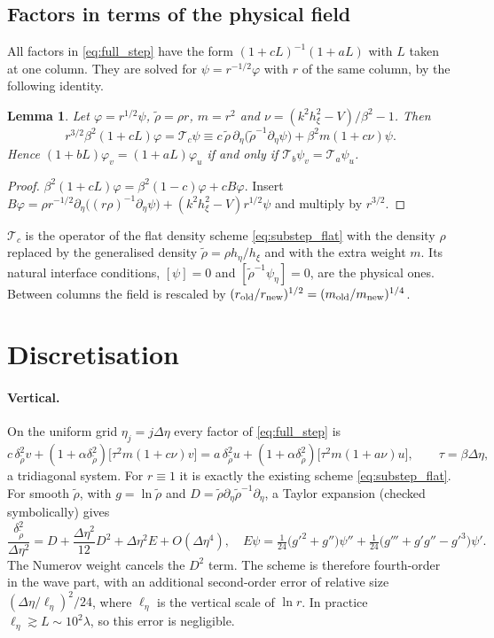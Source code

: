 \documentclass[11pt,a4paper]{article}
\newtheorem{lemma}{Lemma}
\theoremstyle{remark}
\newcommand{\rt}{\tilde\rho}
\newcommand{\het}{\nu}
\newcommand{\pd}{\partial}
\begin{document}
\subsection{Factors in terms of the physical field}

All factors in \eqref{eq:full_step} have the form $(1+cL)^{-1}(1+aL)$ with $L$
taken at one column. They are solved for $\psi=r^{-1/2}\varphi$ with $r$ of the
same column, by the following identity.

\begin{lemma}\label{lem:psi_form}
Let $\varphi=r^{1/2}\psi$, $\rt=\rho r$, $m=r^2$ and
$\het=(k^2h_\xi^2-V)/\beta^2-1$. Then
\[
r^{3/2}\beta^2(1+cL)\varphi=\mathcal T_c\psi\equiv c\,\rt\,\pd_\eta\bigl(\rt^{-1}\pd_\eta\psi\bigr)+\beta^2m(1+c\het)\psi .
\]
Hence $(1+bL)\varphi_v=(1+aL)\varphi_u$ if and only if $\mathcal T_b\psi_v=\mathcal T_a\psi_u$.
\end{lemma}
\begin{proof}
$\beta^2(1+cL)\varphi=\beta^2(1-c)\varphi+cB\varphi$. Insert
$B\varphi=\rho r^{-1/2}\pd_\eta\bigl((r\rho)^{-1}\pd_\eta\psi\bigr)+(k^2h_\xi^2-V)r^{1/2}\psi$
and multiply by $r^{3/2}$.
\end{proof}

$\mathcal T_c$ is the operator of the flat density scheme \eqref{eq:substep_flat}
with the density $\rho$ replaced by the generalised density $\rt=\rho h_\eta/h_\xi$
and with the extra weight $m$. Its natural interface conditions,
$[\psi]=0$ and $[\rt^{-1}\psi_\eta]=0$, are the physical ones. Between columns
the field is rescaled by $(r_{\rm old}/r_{\rm new})^{1/2}=(m_{\rm old}/m_{\rm new})^{1/4}$.

\section{Discretisation}\label{sec:disc}

\paragraph{Vertical.} On the uniform grid $\eta_j=j\Delta\eta$ every factor of
\eqref{eq:full_step} is
\begin{equation}\label{eq:scheme}
c\,\delta^2_{\rt}v+(1+\alpha\delta^2_{\rt})\bigl[\tau^2m(1+c\het)v\bigr]=a\,\delta^2_{\rt}u+(1+\alpha\delta^2_{\rt})\bigl[\tau^2m(1+a\het)u\bigr],\qquad\tau=\beta\Delta\eta,
\end{equation}
a tridiagonal system. For $r\equiv1$ it is exactly the existing scheme
\eqref{eq:substep_flat}. For smooth $\rt$, with $g=\ln\rt$ and
$D=\rt\pd_\eta\rt^{-1}\pd_\eta$, a Taylor expansion (checked symbolically) gives
\[
\frac{\delta^2_{\rt}}{\Delta\eta^2}=D+\frac{\Delta\eta^2}{12}D^2+\Delta\eta^2E+O(\Delta\eta^4),\quad
E\psi=\tfrac1{24}\bigl(g'^2+g''\bigr)\psi''+\tfrac1{24}\bigl(g'''+g'g''-g'^3\bigr)\psi'.
\]
The Numerov weight cancels the $D^2$ term. The scheme is therefore fourth-order
in the wave part, with an additional second-order error of relative size
$(\Delta\eta/\ell_\eta)^2/24$, where $\ell_\eta$ is the vertical scale of $\ln r$.
In practice $\ell_\eta\gtrsim L\sim10^2\lambda$, so this error is negligible.
\end{document}
